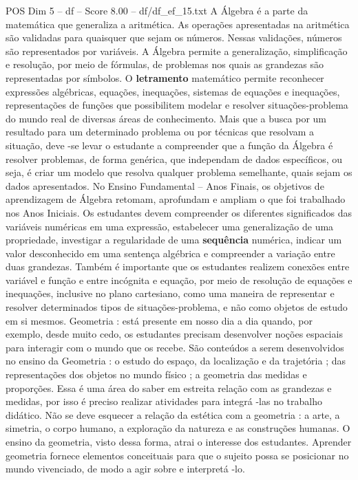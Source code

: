 \begin{textsample}{POS Dim 5 – df – Score 8.00 – df/df\_ef\_15.txt}
A Álgebra é a parte da matemática que generaliza a aritmética.
As operações apresentadas na aritmética são validadas para quaisquer que sejam os números.
Nessas validações, números são representados por variáveis.
A Álgebra permite a generalização, simplificação e resolução, por meio de fórmulas, de problemas nos quais as grandezas são representadas por símbolos.
O \textbf{letramento} matemático permite reconhecer expressões algébricas, equações, inequações, sistemas de equações e inequações, representações de funções que possibilitem modelar e resolver situações-problema do mundo real de diversas áreas de conhecimento.
Mais que a busca por um resultado para um determinado problema ou por técnicas que resolvam a situação, deve -se levar o estudante a compreender que a função da Álgebra é resolver problemas, de forma genérica, que independam de dados específicos, ou seja, é criar um modelo que resolva qualquer problema semelhante, quais sejam os dados apresentados.
No Ensino Fundamental – Anos Finais, os objetivos de aprendizagem de Álgebra retomam, aprofundam e ampliam o que foi trabalhado nos Anos Iniciais.
Os estudantes devem compreender os diferentes significados das variáveis numéricas em uma expressão, estabelecer uma generalização de uma propriedade, investigar a regularidade de uma \textbf{sequência} numérica, indicar um valor desconhecido em uma sentença algébrica e compreender a variação entre duas grandezas.
Também é importante que os estudantes realizem conexões entre variável e função e entre incógnita e equação, por meio de resolução de equações e inequações, inclusive no plano cartesiano, como uma maneira de representar e resolver determinados tipos de situações-problema, e não como objetos de estudo em si mesmos.
Geometria : está presente em nosso dia a dia quando, por exemplo, desde muito cedo, os estudantes precisam desenvolver noções espaciais para interagir com o mundo que os recebe.
São conteúdos a serem desenvolvidos no ensino da Geometria : o estudo do espaço, da localização e da trajetória ; das representações dos objetos no mundo físico ; a geometria das medidas e proporções.
Essa é uma área do saber em estreita relação com as grandezas e medidas, por isso é preciso realizar atividades para integrá -las no trabalho didático.
Não se deve esquecer a relação da estética com a geometria : a arte, a simetria, o corpo humano, a exploração da natureza e as construções humanas.
O ensino da geometria, visto dessa forma, atrai o interesse dos estudantes.
Aprender geometria fornece elementos conceituais para que o sujeito possa se posicionar no mundo vivenciado, de modo a agir sobre e interpretá -lo.

\end{textsample}

